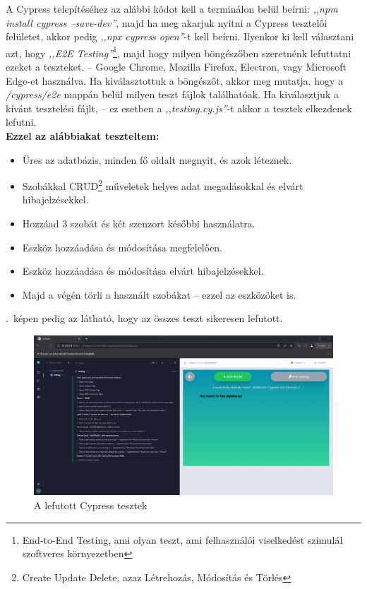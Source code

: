 \documentclass[
]{thesis-ekf}
\theoremstyle{definition}
\theoremstyle{remark}
\begin{document}
	A Cypress telepítéséhez az alábbi kódot kell a terminálon belül beírni: \emph{,,npm install cypress --save-dev''}, majd ha meg akarjuk nyitni a Cypress tesztelői felületet, akkor pedig \emph{,,npx cypress open''}-t kell beírni. Ilyenkor ki kell választani azt, hogy \emph{,,E2E Testing''}\footnote{End-to-End Testing, ami olyan teszt, ami felhasználói viselkedést szimulál szoftveres környezetben}, majd hogy milyen böngészőben szeretnénk lefuttatni ezeket a teszteket. -- Google Chrome, Mozilla Firefox, Electron, vagy Microsoft Edge-et használva. Ha kiválasztottuk a böngészőt, akkor meg mutatja, hogy a \emph{/cypress/e2e} mappán belül milyen teszt fájlok találhatóak. Ha kiválasztjuk a kívánt tesztelési fájlt, -- ez esetben a \emph{,,testing.cy.js''}-t akkor a tesztek elkezdenek lefutni.\\
	\textbf{Ezzel az alábbiakat teszteltem:}\\
	\begin{itemize}
		\item Üres az adatbázis, minden fő oldalt megnyit, és azok léteznek.
		\item Szobákkal CRUD\footnote{Create Update Delete, azaz Létrehozás, Módosítás és Törlés} műveletek helyes adat megadásokkal és elvárt hibajelzésekkel.
		\item Hozzáad 3 szobát és két szenzort későbbi használatra.
		\item Eszköz hozzáadása és módosítása megfelelően.
		\item Eszköz hozzáadása és módosítása elvárt hibajelzésekkel.
		\item Majd a végén törli a használt szobákat -- ezzel az eszközöket is.
	\end{itemize}
	.~képen pedig az látható, hogy az összes teszt sikeresen lefutott.
	
	\begin{figure}[ht!]
		\centering
		\includegraphics[width=1\textwidth]{./src/pages_img/cypress}
		\caption{A lefutott Cypress tesztek}
		\label{cypress-test}
	\end{figure}
\end{document}
